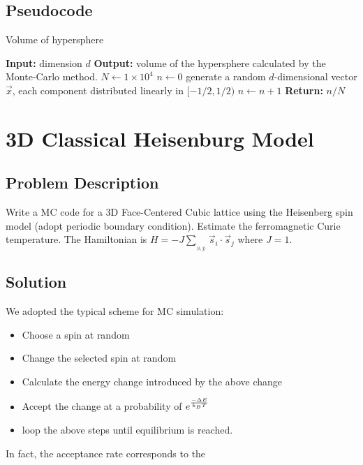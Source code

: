 \documentclass{article}
\begin{document}
\subsection{Pseudocode}
\begin{algorithm}[H]%
\caption{Volume of hypersphere}
    \begin{algorithmic}[1]%
        \Statex\textbf{Input:} dimension $d$
        \Statex\textbf{Output:} volume of the hypersphere calculated by the Monte-Carlo method.
        \State $N \gets 1\times 10^{4}$
        \State $n\gets 0$
        		\State generate a random $d$-dimensional vector $\vec{x}$, each component distributed linearly in $[-1/2, 1/2)$
        			\State $n \gets n + 1$
        		\EndIf
        \EndFor
	\Statex\textbf{Return:} $n / N$
    \end{algorithmic}
\end{algorithm}

\section{3D Classical Heisenburg Model }
\subsection{Problem Description}
Write a MC code for a 3D Face-Centered Cubic lattice using the Heisenberg spin model (adopt periodic boundary condition). Estimate the ferromagnetic Curie temperature. The Hamiltonian is $H=-J\sum__{\langle i,j\rangle}\vec{s}_i\cdot \vec{s}_j$ where $J=1$.

\subsection{Solution}
We adopted the typical scheme for MC simulation:
\begin{itemize}
	\item Choose a spin at random
	\item Change the selected spin at random
	\item Calculate the energy change introduced by the above change
	\item Accept the change at a probability of $e^{-\Delta E\over k_B T}$
	\item loop the above steps until equilibrium is reached.
\end{itemize}
In fact, the acceptance rate corresponds to the 
\end{document}
